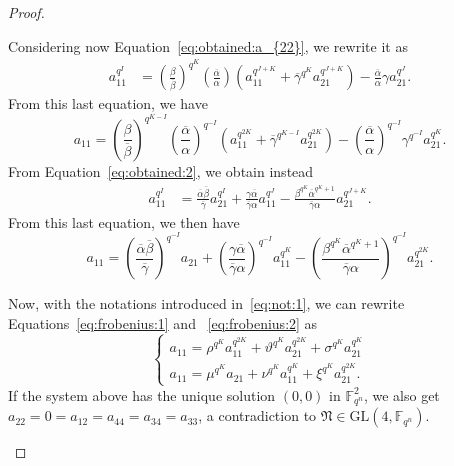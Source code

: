 \begin{proof}
\begin{enumerate}
Considering now Equation~\eqref{eq:obtained:a_{22}}, we rewrite it as
\begin{equation*}
    \begin{split}
        a_{11}^{q^I} &= \left(\frac{\beta}{\overline{\beta}}\right)^{q^K}\left(\frac{\overline{\alpha}}{\alpha}\right)\left(a_{11}^{q^{J+K}} + \overline{\gamma}^{q^K}a_{21}^{q^{J+K}}\right) - \frac{\overline{\alpha}}{\alpha}\gamma a_{21}^{q^J}.
    \end{split}
\end{equation*}
From this last equation, we have
\begin{equation}
\label{eq:frobenius:1}
           a_{11} = \left(\frac{\beta}{\overline{\beta}}\right)^{q^{K-I}}\left(\frac{\overline{\alpha}}{\alpha}\right)^{q^{-I}}\left(a_{11}^{q^{2K}} + \overline{\gamma}^{q^{K-I}}a_{21}^{q^{2K}}\right) - \left(\frac{\overline{\alpha}}{\alpha}\right)^{q^{-I}}\gamma^{q^{-I}} a_{21}^{q^K}.
\end{equation}
From Equation~\eqref{eq:obtained:2}, we obtain instead
\begin{equation*}
  \begin{split}
 a_{11}^{q^I} &= \frac{\overline{\alpha}\overline{\beta}}{\overline{\gamma}}a_{21}^{q^I} + \frac{\gamma \overline{\alpha}}{\overline{\gamma}\alpha}a_{11}^{q^J} - \frac{\beta^{q^K}\overline{\alpha}^{q^K+1}}{\overline{\gamma}\alpha}a_{21}^{q^{J+K}}.
    \end{split}
\end{equation*}
From this last equation, we then have
\begin{equation}
\label{eq:frobenius:2}
           a_{11} = \left(\frac{\overline{\alpha}\overline{\beta}}{\overline{\gamma}}\right)^{q^{-I}}a_{21} + \left(\frac{\gamma \overline{\alpha}}{\overline{\gamma}\alpha}\right)^{q^{-I}}a_{11}^{q^K} - \left(\frac{\beta^{q^K}\overline{\alpha}^{q^K+1}}{\overline{\gamma}\alpha}\right)^{q^{-I}}a_{21}^{q^{2K}}.
\end{equation}

Now, with the notations introduced in~\eqref{eq:not:1}, we can rewrite Equations~\eqref{eq:frobenius:1} and ~\eqref{eq:frobenius:2} as
\begin{equation}\label{O'Sistemone}
    \begin{cases}
    a_{11} = \rho^{q^K}a_{11}^{q^{2K}} + \vartheta^{q^K}a_{21}^{q^{2K}} + \sigma^{q^K}a_{21}^{q^K}\\
    a_{11} = \mu^{q^K}a_{21} + \nu^{q^K}a_{11}^{q^K} + \xi^{q^K}a_{21}^{q^{2K}}. 
    \end{cases}
\end{equation}
If the system above has the unique solution $(0,0)$ in $\mathbb{F}_{q^n}^2$, we also get $a_{22}=0=a_{12}=a_{44}=a_{34}=a_{33}$, a contradiction to $\mathfrak{N}\in \mathrm{GL}(4,\mathbb{F}_{q^n})$.\qedhere
\end{enumerate} \end{proof}

